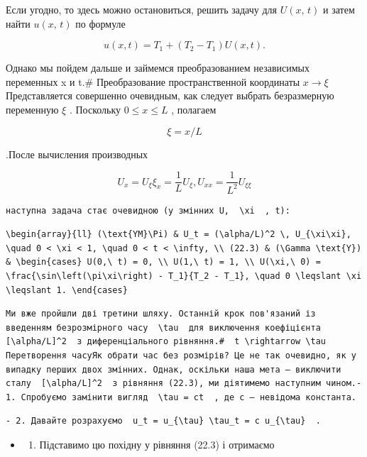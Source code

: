 \documentclass[
  ukrainian,
]{article}
\providecommand{\tightlist}{%
  \setlength{\itemsep}{0pt}\setlength{\parskip}{0pt}}
\begin{document}
Если угодно, то здесь можно остановиться, решить задачу для
\(U\left(x,\, t\right)\) и затем найти \(u\left(x,\,t\right)\) по
формуле

\[
u(x, t) = T_1 + (T_2 - T_1) U(x, t).
\]

Однако мы пойдем дальше и займемся преобразованием независимых
переменных x и t.\# Преобразование пространственной координаты
\(x \rightarrow \xi\) Представляется совершенно очевидным, как следует
выбрать безразмерную переменную \(\xi\) . Поскольку
\(0 \leqslant x \leqslant L\) , полагаем

\[
\xi = x/L
\]

.После вычисления производных

\[
U_x = U_{\xi} \xi_x = \frac{1}{L} U_{\xi},
U_{xx} = \frac{1}{L^2} U_{\xi\xi}
\]

\begin{verbatim}
наступна задача стає очевидною (у змінних U,  \xi  , t):
\end{verbatim}

\begin{verbatim}
\begin{array}{ll} (\text{YM}\Pi) & U_t = (\alpha/L)^2 \, U_{\xi\xi}, \quad 0 < \xi < 1, \quad 0 < t < \infty, \\ (22.3) & (\Gamma \text{Y}) & \begin{cases} U(0,\ t) = 0, \\ U(1,\ t) = 1, \\ U(\xi,\ 0) = \frac{\sin\left(\pi\xi\right) - T_1}{T_2 - T_1}, \quad 0 \leqslant \xi \leqslant 1. \end{cases}
\end{verbatim}

\begin{verbatim}
Ми вже пройшли дві третини шляху. Останній крок пов'язаний із введенням безрозмірного часу  \tau  для виключення коефіцієнта  [\alpha/L]^2  з диференціального рівняння.#  t \rightarrow \tau  Перетворення часуЯк обрати час без розмірів? Це не так очевидно, як у випадку перших двох змінних. Однак, оскільки наша мета — виключити сталу  [\alpha/L]^2  з рівняння (22.3), ми діятимемо наступним чином.- 1. Спробуємо замінити вигляд  \tau = ct  , де c — невідома константа.
\end{verbatim}

\begin{verbatim}
- 2. Давайте розрахуємо  u_t = u_{\tau} \tau_t = c u_{\tau}  .
\end{verbatim}

\begin{itemize}
\tightlist
\item
  \begin{enumerate}
  \def\labelenumi{\arabic{enumi}.}
  \setcounter{enumi}{2}
  \tightlist
  \item
    Підставимо цю похідну у рівняння (22.3) і отримаємо
  \end{enumerate}
\end{itemize}
\end{document}
